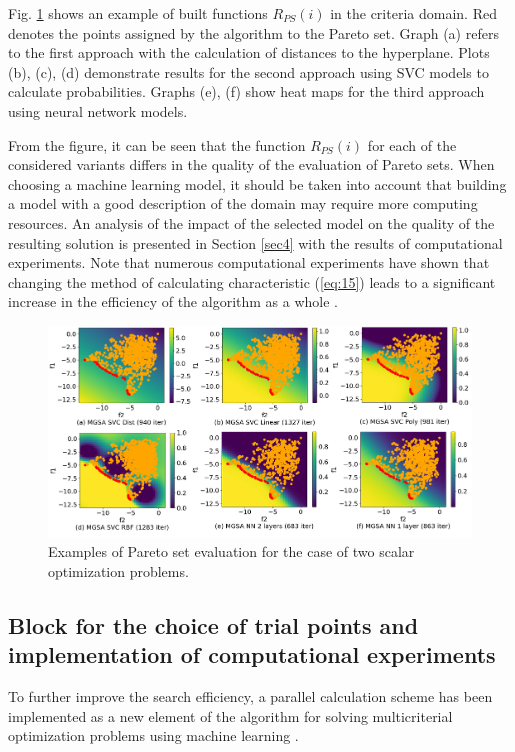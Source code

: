 \documentclass[runningheads]{llncs}
\begin{document}
Fig. \ref{fig4} shows an example of built functions $R_{PS}(i)$ in the criteria domain. Red denotes the points assigned by the algorithm to the Pareto set. Graph (a) refers to the first approach with the calculation of distances to the hyperplane. Plots (b), (c), (d) demonstrate results for the second approach using SVC models to calculate probabilities. Graphs (e), (f) show heat maps for the third approach using neural network models.

From the figure, it can be seen that the function $R_{PS}(i)$ for each of the considered variants differs in the quality of the evaluation of Pareto sets. When choosing a machine learning model, it should be taken into account that building a model with a good description of the domain may require more computing resources. An analysis of the impact of the selected model on the quality of the resulting solution is presented in Section \ref{sec4} with the results of computational experiments. Note that numerous computational experiments have shown that changing the method of calculating characteristic (\ref{eq:15}) leads to a significant increase in the efficiency of the algorithm as a whole \cite{Konnov2025,MCO_ML_2023}.

\begin{figure}[t]
\center
\includegraphics[width=\textwidth]{fig4.png}
\caption{Examples of Pareto set evaluation for the case of two scalar optimization problems.} \label{fig4}
\end{figure}


\subsection{Block for the choice of trial points and implementation of computational experiments}
\label{subsec35}

To further improve the search efficiency, a parallel calculation scheme has been implemented as a new element of the algorithm for solving multicriterial optimization problems using machine learning \cite{ioptmco}. 
\end{document}
